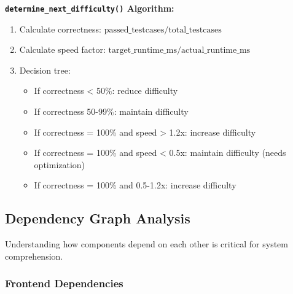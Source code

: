 \documentclass[12pt,a4paper,oneside]{article}
\newcommand{\funcname}[1]{\texttt{\textbf{#1}}}
\begin{document}
\textbf{\funcname{determine\_next\_difficulty()} Algorithm:}

\begin{enumerate}
    \item Calculate correctness: \( \text{passed\_testcases} / \text{total\_testcases} \)
    \item Calculate speed factor: \( \text{target\_runtime\_ms} / \text{actual\_runtime\_ms} \)
    \item Decision tree:
    \begin{itemize}
        \item If correctness < 50\%: reduce difficulty
        \item If correctness 50-99\%: maintain difficulty
        \item If correctness = 100\% and speed > 1.2x: increase difficulty
        \item If correctness = 100\% and speed < 0.5x: maintain difficulty (needs optimization)
        \item If correctness = 100\% and 0.5-1.2x: increase difficulty
    \end{itemize}
\end{enumerate}

\newpage

\subsection{Dependency Graph Analysis}

Understanding how components depend on each other is critical for system comprehension.

\subsubsection{Frontend Dependencies}
\end{document}
